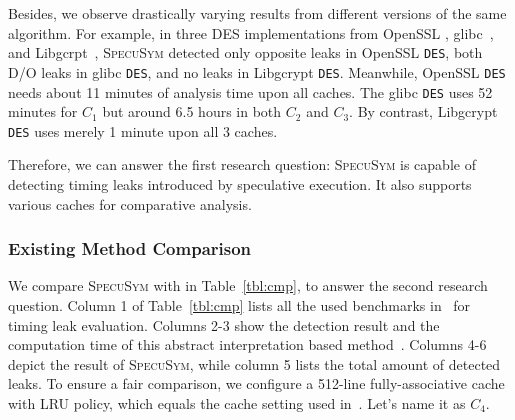 \documentclass[sigconf,screen]{acmart}
\newcommand{\SpecuSym}{\textsc{SpecuSym} }
\begin{document}
Besides, we observe drastically varying results from different versions of the 
same algorithm. For example, in three DES implementations from OpenSSL
\cite{OpenSSL111c}, glibc~\cite{glibc}, and Libgcrpt~\cite{Libgcrypt}, 
\SpecuSym detected only opposite leaks in OpenSSL \texttt{DES}, both D/O 
leaks in glibc \texttt{DES}, and no leaks in Libgcrypt \texttt{DES}. Meanwhile, 
OpenSSL \texttt{DES} needs about 11 minutes of analysis time upon all caches. 
The glibc \texttt{DES} uses 52 minutes for $C_1$ but around 6.5 hours in both 
$C_2$ and $C_3$. By contrast, Libgcrypt \texttt{DES} uses merely 1 minute upon 
all 3 caches. 


Therefore, we can answer the first research question: \SpecuSym is capable of 
detecting timing leaks introduced by speculative execution. It also supports 
various caches for comparative analysis.


\subsubsection{Existing Method Comparison}
\label{sec:comparison}

We compare \SpecuSym with \cite{WuW19} in Table~\ref{tbl:cmp}, to answer the 
second research question. Column 1 of Table~\ref{tbl:cmp} lists all the used
benchmarks in~\cite{WuW19} for timing leak evaluation. Columns 2-3 show the 
detection result and the computation time of this abstract interpretation 
based method~\cite{WuW19}. Columns 4-6 depict the result of \textsc{SpecuSym}, 
while column 5 lists the total amount of detected leaks. To ensure a fair 
comparison, we configure a 512-line fully-associative cache with LRU policy, 
which equals the cache setting used in~\cite{WuW19}. Let's name it as $C_4$.
\end{document}
